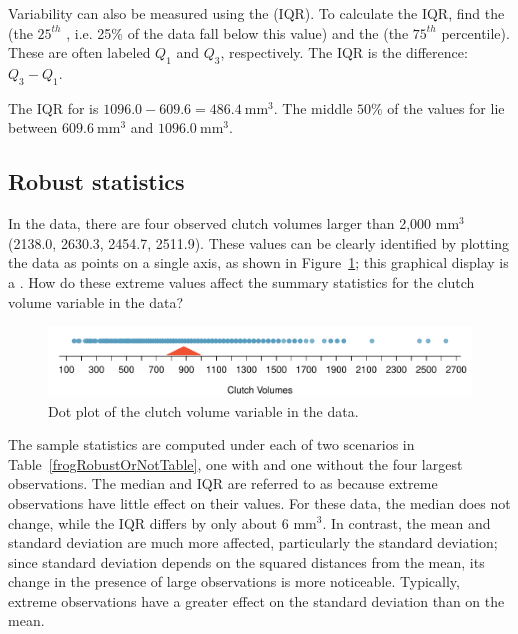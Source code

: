 \begin{doublespace}
Variability can also be measured using the  (IQR).  To calculate the IQR, find the   (the $25^{th}$ , i.e. 25\% of the data fall below this value) and the   (the $75^{th}$ percentile). These are often labeled $Q_1$ and $Q_3$, respectively. The IQR is the difference: $Q_3 - Q_1$.

The IQR for  is $1096.0 - 609.6 = 486.4\ \textrm{mm}^{3}$.  The middle $50\%$ of the values for  lie between $609.6\ \textrm{mm}^{3}$ and $1096.0\ \textrm{mm}^{3}$.

\subsection{Robust statistics}

In the  data, there are four observed clutch volumes larger than 2,000 $\textrm{mm}^{3}$ (2138.0, 2630.3, 2454.7, 2511.9). These values can be clearly identified by plotting the data as points on a single axis, as shown in Figure~\ref{frogClutchVolDotPlot}; this graphical display is a . How do these extreme values affect the summary statistics for the clutch volume variable in the  data?

\begin{figure}[ht]
	\centering
	\includegraphics[width=\textwidth]{ch_intro_to_data_oi_biostat/figures/frogClutchVolDotPlot/frogClutchVolDotPlot}
	\caption{Dot plot of the clutch volume variable in the  data.}
	\label{frogClutchVolDotPlot}
\end{figure}

The sample statistics are computed under each of two scenarios in Table~\ref{frogRobustOrNotTable}, one with and one without the four largest observations. The median and IQR are referred to as  because extreme observations have little effect on their values. For these data, the median does not change, while the IQR differs by only about 6 $\textrm{mm}^{3}$. In contrast, the mean and standard deviation are much more affected, particularly the standard deviation; since standard deviation depends on the squared distances from the mean, its change in the presence of large observations is more noticeable. Typically, extreme observations have a greater effect on the standard deviation than on the mean.


\end{doublespace}
